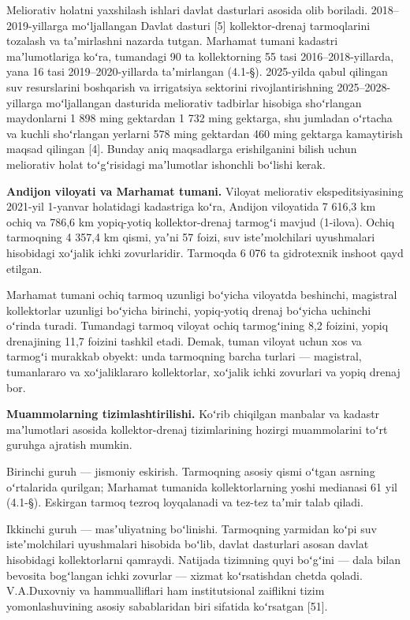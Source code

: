Meliorativ holatni yaxshilash ishlari davlat dasturlari asosida olib
boriladi. 2018--2019-yillarga moʻljallangan Davlat dasturi {[}5{]}
kollektor-drenaj tarmoqlarini tozalash va taʼmirlashni nazarda tutgan.
Marhamat tumani kadastri maʼlumotlariga koʻra, tumandagi 90 ta
kollektorning 55 tasi 2016--2018-yillarda, yana 16 tasi
2019--2020-yillarda taʼmirlangan (4.1-§). 2025-yilda qabul qilingan suv
resurslarini boshqarish va irrigatsiya sektorini rivojlantirishning
2025--2028-yillarga moʻljallangan dasturida meliorativ tadbirlar
hisobiga shoʻrlangan maydonlarni 1 898 ming gektardan 1 732 ming
gektarga, shu jumladan oʻrtacha va kuchli shoʻrlangan yerlarni 578 ming
gektardan 460 ming gektarga kamaytirish maqsad qilingan {[}4{]}. Bunday
aniq maqsadlarga erishilganini bilish uchun meliorativ holat
toʻgʻrisidagi maʼlumotlar ishonchli boʻlishi kerak.

\textbf{Andijon viloyati va Marhamat tumani.} Viloyat meliorativ
ekspeditsiyasining 2021-yil 1-yanvar holatidagi kadastriga koʻra,
Andijon viloyatida 7 616,3 km ochiq va 786,6 km yopiq-yotiq
kollektor-drenaj tarmogʻi mavjud (1-ilova). Ochiq tarmoqning 4 357,4 km
qismi, yaʼni 57 foizi, suv isteʼmolchilari uyushmalari hisobidagi
xoʻjalik ichki zovurlaridir. Tarmoqda 6 076 ta gidrotexnik inshoot qayd
etilgan.

Marhamat tumani ochiq tarmoq uzunligi boʻyicha viloyatda beshinchi,
magistral kollektorlar uzunligi boʻyicha birinchi, yopiq-yotiq drenaj
boʻyicha uchinchi oʻrinda turadi. Tumandagi tarmoq viloyat ochiq
tarmogʻining 8,2 foizini, yopiq drenajining 11,7 foizini tashkil etadi.
Demak, tuman viloyat uchun xos va tarmogʻi murakkab obyekt: unda
tarmoqning barcha turlari --- magistral, tumanlararo va xoʻjaliklararo
kollektorlar, xoʻjalik ichki zovurlari va yopiq drenaj bor.

\textbf{Muammolarning tizimlashtirilishi.} Koʻrib chiqilgan manbalar va
kadastr maʼlumotlari asosida kollektor-drenaj tizimlarining hozirgi
muammolarini toʻrt guruhga ajratish mumkin.

Birinchi guruh --- jismoniy eskirish. Tarmoqning asosiy qismi oʻtgan
asrning oʻrtalarida qurilgan; Marhamat tumanida kollektorlarning yoshi
medianasi 61 yil (4.1-§). Eskirgan tarmoq tezroq loyqalanadi va tez-tez
taʼmir talab qiladi.

Ikkinchi guruh --- masʼuliyatning boʻlinishi. Tarmoqning yarmidan koʻpi
suv isteʼmolchilari uyushmalari hisobida boʻlib, davlat dasturlari
asosan davlat hisobidagi kollektorlarni qamraydi. Natijada tizimning
quyi boʻgʻini --- dala bilan bevosita bogʻlangan ichki zovurlar ---
xizmat koʻrsatishdan chetda qoladi. V.A.Duxovniy va hammualliflari ham
institutsional zaiflikni tizim yomonlashuvining asosiy sabablaridan biri
sifatida koʻrsatgan {[}51{]}.

